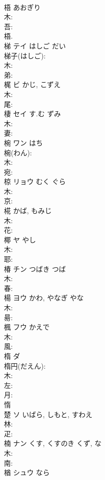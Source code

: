 \documentclass[8pt]{extreport}
\begin{document}
\begin{CJK}{UTF8}{min}
\\	梧		あおぎり				
\\	木: 
\\	吾: 
\\	梧.
\\	梯	テイ	はしご	だい	
\\	梯子(はしご): 
\\	木: 
\\	弟: 
\\	梶	ビ	かじ, こずえ		
\\	木: 
\\	尾: 
\\	棲	セイ	す.む	ずみ	
\\	木: 
\\	妻: 
\\	椀	ワン	はち		
\\	椀(わん): 
\\	木: 
\\	宛: 
\\	椋	リョウ	むく	ぐら	
\\	木: 
\\	京: 
\\	椛		かば, もみじ				
\\	木: 
\\	花: 
\\	椰	ヤ	やし		
\\	木: 
\\	耶: 
\\	椿	チン	つばき	つば	
\\	木: 
\\	春: 
\\	楊	ヨウ	かわ, やなぎ	やな	
\\	木: 
\\	昜: 
\\	楓	フウ	かえで		
\\	木: 
\\	風: 
\\	楕	ダ			
\\	楕円(だえん): 
\\	木: 
\\	左: 
\\	月: 
\\	惰 
\\	楚	ソ	いばら, しもと, すわえ		
\\	林: 
\\	疋: 
\\	楠	ナン	くす, くすのき	くず, な	
\\	木: 
\\	南: 
\\	楢	シュウ	なら		

\end{CJK}
\end{document}

